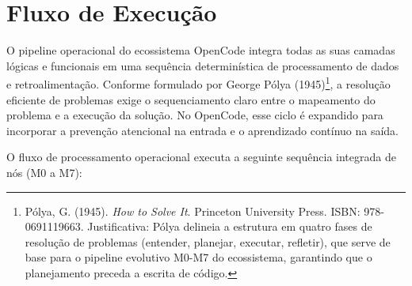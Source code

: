 \documentclass[12pt,a4paper,oneside]{abntex2}
\begin{document}
\section{Fluxo de Execução}

O pipeline operacional do ecossistema OpenCode integra todas as suas camadas lógicas e funcionais em uma sequência determinística de processamento de dados e retroalimentação. Conforme formulado por George Pólya (1945)\footnote{Pólya, G. (1945). \textit{How to Solve It}. Princeton University Press. ISBN: 978-0691119663. Justificativa: Pólya delineia a estrutura em quatro fases de resolução de problemas (entender, planejar, executar, refletir), que serve de base para o pipeline evolutivo M0-M7 do ecossistema, garantindo que o planejamento preceda a escrita de código.}, a resolução eficiente de problemas exige o sequenciamento claro entre o mapeamento do problema e a execução da solução. No OpenCode, esse ciclo é expandido para incorporar a prevenção atencional na entrada e o aprendizado contínuo na saída.

O fluxo de processamento operacional executa a seguinte sequência integrada de nós (M0 a M7):
\end{document}

